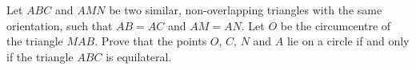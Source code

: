 Let $ABC$ and $AMN$ be two similar, non-overlapping triangles with the same orientation,
such that $AB=AC$ and $AM=AN$.
Let $O$ be the circumcentre of the triangle $MAB$.
Prove that the points $O$, $C$, $N$ and $A$ lie on a circle if and only if the triangle $ABC$ is equilateral.
